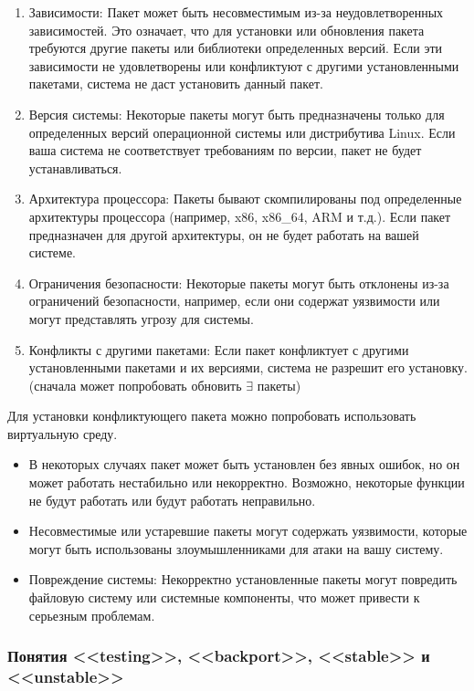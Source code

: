 \documentclass[oneside, final, 14pt]{extreport} %
\begin{document}
\begin{enumerate}
    \item Зависимости: Пакет может быть несовместимым из-за неудовлетворенных зависимостей. Это означает, что для установки или обновления пакета требуются другие пакеты или библиотеки определенных версий. Если эти зависимости не удовлетворены или конфликтуют с другими установленными пакетами, система не даст установить данный пакет.
    \item Версия системы: Некоторые пакеты могут быть предназначены только для определенных версий операционной системы или дистрибутива Linux. Если ваша система не соответствует требованиям по версии, пакет не будет устанавливаться.
    \item Архитектура процессора: Пакеты бывают скомпилированы под определенные архитектуры процессора (например, x86, x86\_64, ARM и т.д.). Если пакет предназначен для другой архитектуры, он не будет работать на вашей системе.
    \item Ограничения безопасности: Некоторые пакеты могут быть отклонены из-за ограничений безопасности, например, если они содержат уязвимости или могут представлять угрозу для системы.
    \item Конфликты с другими пакетами: Если пакет конфликтует с другими установленными пакетами и их версиями, система не разрешит его установку. (сначала может попробовать обновить $\exists$ пакеты)
\end{enumerate}

Для установки конфликтующего пакета можно попробовать использовать виртуальную среду.

\begin{itemize}
    \item В некоторых случаях пакет может быть установлен без явных ошибок, но он может работать нестабильно или некорректно. Возможно, некоторые функции не будут работать или будут работать неправильно.
    \item Несовместимые или устаревшие пакеты могут содержать уязвимости, которые могут быть использованы злоумышленниками для атаки на вашу систему.
    \item Повреждение системы: Некорректно установленные пакеты могут повредить файловую систему или системные компоненты, что может привести к серьезным проблемам.
\end{itemize}

\subsubsection{Понятия <<testing>>, <<backport>>, <<stable>> и <<unstable>>}
\end{document}
